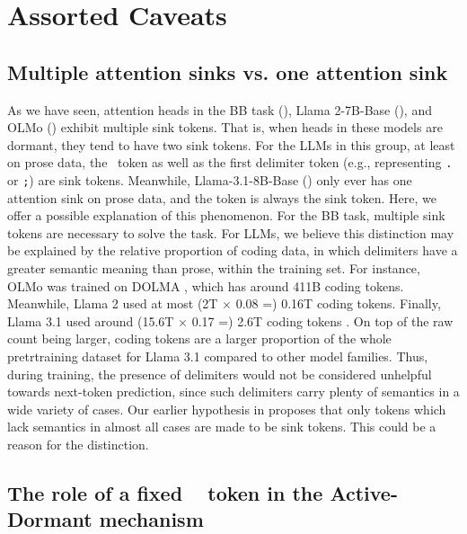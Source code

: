 \section{Assorted Caveats}\label{sec:caveats}

\subsection{Multiple attention sinks vs. one attention sink}\label{sub:multiple_sinks_discussion}

As we have seen, attention heads in the BB task (), Llama 2-7B-Base (), and OLMo () exhibit multiple sink tokens. That is, when heads in these models are dormant, they tend to have two sink tokens. For the LLMs in this group, at least on prose data, the \bos~token as well as the first delimiter token (e.g., representing \texttt{.} or \texttt{;}) are sink tokens. Meanwhile, Llama-3.1-8B-Base () only ever has one attention sink on prose data, and the \bos{} token is always the sink token. Here, we offer a possible explanation of this phenomenon. For the BB task, multiple sink tokens are necessary to solve the task. For LLMs, we believe this distinction may be explained by the relative proportion of coding data, in which delimiters have a greater semantic meaning than prose, within the training set. For instance, OLMo was trained on DOLMA \citep{soldaini2024dolma}, which has around 411B coding tokens. Meanwhile, Llama 2 used at most (2T \(\times\) 0.08 =) 0.16T coding tokens. Finally, Llama 3.1 used around (15.6T \(\times\) 0.17 =) 2.6T coding tokens \citep{dubey2024llama}. On top of the raw count being larger, coding tokens are a larger proportion of the whole pretrtraining dataset for Llama 3.1 compared to other model families. Thus, during training, the presence of delimiters would not be considered unhelpful towards next-token prediction, since such delimiters carry plenty of semantics in a wide variety of cases. Our earlier hypothesis in  proposes that only tokens which lack semantics in almost all cases are made to be sink tokens. This could be a reason for the distinction.

\subsection{The role of a fixed \bos~ token in the Active-Dormant mechanism}\label{sub:fixed_bos}



